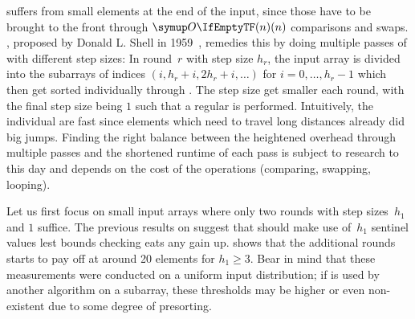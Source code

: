 \IS{} suffers from small elements at the end of the input, since those have to be brought to the front through \(\bigoh{n}\) comparisons and swaps.
\ShS{}, proposed by Donald L. Shell in 1959~\cite{Shell1959AHS}, remedies this by doing multiple passes of \IS{} with different step sizes:
In round~\(r\) with step size \(h_r\), the input array is divided into the subarrays of indices \((i, h_r + i, 2 h_r + i, \dots)\) for \(i = 0, \dots, h_r - 1\) which then get sorted individually through \IS{}.
The step size get smaller each round, with the final step size being \(1\) such that a regular \IS{} is performed.
Intuitively, the individual \IS*{} are fast since elements which need to travel long distances already did big jumps.
Finding the right balance between the heightened overhead through multiple \IS{} passes and the shortened runtime of each \IS{} pass is subject to research to this day \cite{skean2023optimization, lee2021empirically} and depends on the cost of the operations (comparing, swapping, looping).

Let us first focus on small input arrays where only two rounds with step sizes~\(h_1\) and \(1\) suffice.
The previous results on \IS{} suggest that \ShS{} should make use of~\(h_1\) sentinel values lest bounds checking eats any gain up.
 shows that the additional rounds starts to pay off at around 20 elements for \(h_1 \ge 3\).
Bear in mind that these measurements were conducted on a uniform input distribution;
if \ShS{} is used by another algorithm on a subarray, these thresholds may be higher or even non-existent due to some degree of presorting.


